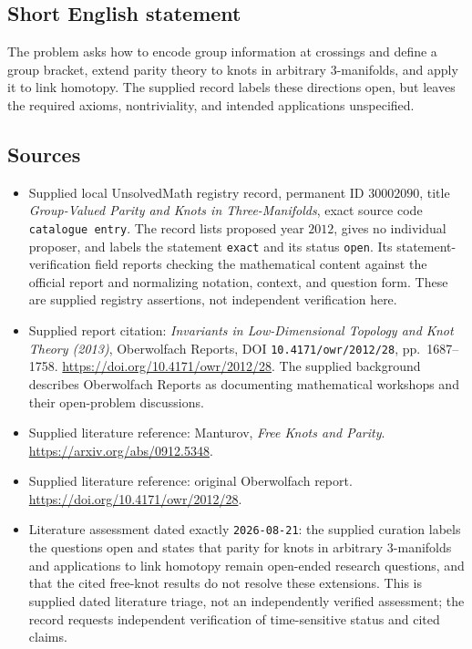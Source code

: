 \documentclass[11pt]{article}
\begin{document}
\subsection{Short English statement}
The problem asks how to encode group information at crossings and define a group bracket, extend parity theory to knots in arbitrary \(3\)-manifolds, and apply it to link homotopy. The supplied record labels these directions open, but leaves the required axioms, nontriviality, and intended applications unspecified.
\subsection{Sources}
\begin{itemize}
\item Supplied local UnsolvedMath registry record, permanent ID \(30002090\), title \emph{Group-Valued Parity and Knots in Three-Manifolds}, exact source code \texttt{catalogue entry}. The record lists proposed year \(2012\), gives no individual proposer, and labels the statement \texttt{exact} and its status \texttt{open}. Its statement-verification field reports checking the mathematical content against the official report and normalizing notation, context, and question form. These are supplied registry assertions, not independent verification here.
\item Supplied report citation: \emph{Invariants in Low-Dimensional Topology and Knot Theory (2013)}, Oberwolfach Reports, DOI \texttt{10.4171/owr/2012/28}, pp.\ 1687--1758. \url{https://doi.org/10.4171/owr/2012/28}. The supplied background describes Oberwolfach Reports as documenting mathematical workshops and their open-problem discussions.
\item Supplied literature reference: Manturov, \emph{Free Knots and Parity}. \url{https://arxiv.org/abs/0912.5348}.
\item Supplied literature reference: original Oberwolfach report. \url{https://doi.org/10.4171/owr/2012/28}.
\item Literature assessment dated exactly \texttt{2026-08-21}: the supplied curation labels the questions open and states that parity for knots in arbitrary \(3\)-manifolds and applications to link homotopy remain open-ended research questions, and that the cited free-knot results do not resolve these extensions. This is supplied dated literature triage, not an independently verified assessment; the record requests independent verification of time-sensitive status and cited claims.
\end{itemize}
\end{document}
